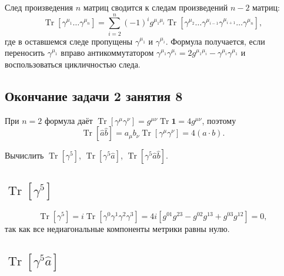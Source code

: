 \documentclass[../final.tex]{subfiles}
\begin{document}


След произведения $n$ матриц сводится к следам произведений $n-2$ матриц:
\begin{equation*}
    \operatorname{Tr}\left[\gamma^{\mu_1}\ldots\gamma^{\mu_n}\right]
    =\sum_{i=2}^{n}(-1)^i g^{\mu_1\mu_i}
    \operatorname{Tr}\left[\gamma^{\mu_2}\ldots
    \gamma^{\mu_{i-1}}\gamma^{\mu_{i+1}}\ldots\gamma^{\mu_n}\right],
\end{equation*}
где в оставшемся следе пропущены $\gamma^{\mu_1}$ и $\gamma^{\mu_i}$. Формула получается,
если переносить $\gamma^{\mu_1}$ вправо антикоммутатором
$\gamma^{\mu_1}\gamma^{\mu_i}=2g^{\mu_1\mu_i}-\gamma^{\mu_i}\gamma^{\mu_1}$
и воспользоваться цикличностью следа.

\subsection*{Окончание задачи 2 занятия 8}

При $n=2$ формула даёт
$\operatorname{Tr}[\gamma^\mu\gamma^\nu]=g^{\mu\nu}\operatorname{Tr}\mathbf 1=4g^{\mu\nu}$,
поэтому
\begin{equation*}
    \operatorname{Tr}[\hat a\hat b]
    =a_\mu b_\nu\operatorname{Tr}[\gamma^\mu\gamma^\nu]
    =4(a\cdot b).
\end{equation*}

\label{task:gamma5_traces_sem9}

\condition
Вычислить $\operatorname{Tr}[\gamma^5]$, $\operatorname{Tr}[\gamma^5\hat a]$,
$\operatorname{Tr}[\gamma^5\hat a\hat b]$.

\solution
\subsection*{\texorpdfstring{$\operatorname{Tr}[\gamma^5]$}{Tr γ5}}

\begin{equation*}
    \operatorname{Tr}[\gamma^5]
    =i\operatorname{Tr}\left[\gamma^0\gamma^1\gamma^2\gamma^3\right]
    =4i\left[g^{01}g^{23}-g^{02}g^{13}+g^{03}g^{12}\right]=0,
\end{equation*}
так как все недиагональные компоненты метрики равны нулю.

\subsection*{\texorpdfstring{$\operatorname{Tr}[\gamma^5\hat a]$}{Tr γ5 a}}
\end{document}
